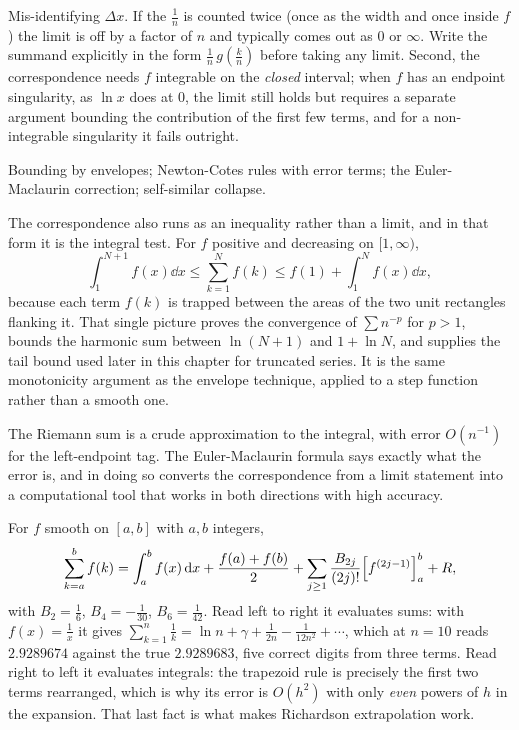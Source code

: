 \begin{trap}
Mis-identifying $\Delta x$. If the $\tfrac1n$ is counted twice (once as the width and once inside $f$) the limit is off by a factor of $n$ and typically comes out as $0$ or $\infty$. Write the summand explicitly in the form $\tfrac1n\,g(\tfrac kn)$ before taking any limit. Second, the correspondence needs $f$ integrable on the \emph{closed} interval; when $f$ has an endpoint singularity, as $\ln x$ does at $0$, the limit still holds but requires a separate argument bounding the contribution of the first few terms, and for a non-integrable singularity it fails outright.
\end{trap}

\begin{seealsob}Bounding by envelopes; Newton-Cotes rules with error terms; the Euler-Maclaurin correction; self-similar collapse.\end{seealsob}

The correspondence also runs as an inequality rather than a limit, and in that form it is the integral test. For $f$ positive and decreasing on $[1,\infty)$,
\[\int_1^{N+1}f(x)\dd x\leq\sum_{k=1}^{N}f(k)\leq f(1)+\int_1^{N}f(x)\dd x,\]
because each term $f(k)$ is trapped between the areas of the two unit rectangles flanking it. That single picture proves the convergence of $\sum n^{-p}$ for $p>1$, bounds the harmonic sum between $\ln(N+1)$ and $1+\ln N$, and supplies the tail bound used later in this chapter for truncated series. It is the same monotonicity argument as the envelope technique, applied to a step function rather than a smooth one.

The Riemann sum is a crude approximation to the integral, with error $O(n^{-1})$ for the left-endpoint tag. The Euler-Maclaurin formula says exactly what the error is, and in doing so converts the correspondence from a limit statement into a computational tool that works in both directions with high accuracy.

\begin{keynote}
For $f$ smooth on $[a,b]$ with $a,b$ integers,
\[\sum_{k=a}^{b}f(k)=\int_a^{b}f(x)\,\mathrm{d} x+\frac{f(a)+f(b)}{2}+\sum_{j\geq1}\frac{B_{2j}}{(2j)!}\Bigl[f^{(2j-1)}\Bigr]_a^{b}+R,\]
with $B_{2}=\tfrac16$, $B_{4}=-\tfrac{1}{30}$, $B_{6}=\tfrac{1}{42}$. Read left to right it evaluates sums: with $f(x)=\tfrac1x$ it gives $\sum_{k=1}^{n}\tfrac1k=\ln n+\gamma+\tfrac{1}{2n}-\tfrac{1}{12n^{2}}+\cdots$, which at $n=10$ reads $2.9289674$ against the true $2.9289683$, five correct digits from three terms. Read right to left it evaluates integrals: the trapezoid rule is precisely the first two terms rearranged, which is why its error is $O(h^{2})$ with only \emph{even} powers of $h$ in the expansion. That last fact is what makes Richardson extrapolation work.
\end{keynote}

